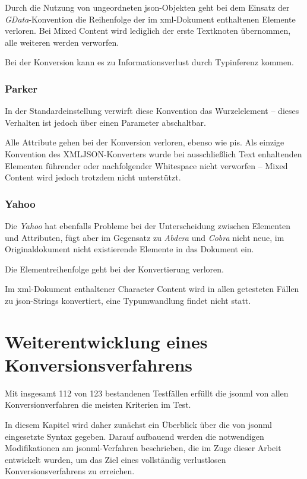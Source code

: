 Durch die Nutzung von ungeordneten \acrshort{json}-Objekten geht bei dem Einsatz der \emph{GData}-Konvention die Reihenfolge der im \acrshort{xml}-Dokument enthaltenen Elemente verloren. Bei Mixed Content wird lediglich der erste Textknoten übernommen, alle weiteren werden verworfen.

Bei der Konversion kann es zu Informationsverlust durch Typinferenz kommen.

\subsection{Parker}
\label{sec:xmljson-parker}

In der Standardeinstellung verwirft diese Konvention das Wurzelelement -- dieses Verhalten ist jedoch über einen Parameter abschaltbar.

Alle Attribute gehen bei der Konversion verloren, ebenso wie \glspl{pi}. Als einzige Konvention des XMLJSON-Konverters wurde bei ausschließlich Text enhaltenden Elementen führender oder nachfolgender Whitespace nicht verworfen -- Mixed Content wird jedoch trotzdem nicht unterstützt.

\subsection{Yahoo}
\label{sec:xmljson-yahoo}

Die \emph{Yahoo} hat ebenfalls Probleme bei der Unterscheidung zwischen Elementen und Attributen, fügt aber im Gegensatz zu \emph{Abdera} und \emph{Cobra} nicht neue, im Originaldokument nicht existierende Elemente in das Dokument ein.

Die Elementreihenfolge geht bei der Konvertierung verloren.

Im \acrshort{xml}-Dokument enthaltener Character Content wird in allen getesteten Fällen zu \acrshort{json}-Strings konvertiert, eine Typumwandlung findet nicht statt.

\chapter{Weiterentwicklung eines Konversionsverfahrens}
\label{chap:jsonml}

Mit insgesamt 112 von 123 bestandenen Testfällen erfüllt die \acrfull{jsonml} von allen Konversionverfahren die meisten Kriterien im Test.

In diesem Kapitel wird daher zunächst ein Überblick über die von \acrshort{jsonml} eingesetzte Syntax gegeben.
Darauf aufbauend werden die notwendigen Modifikationen am \acrshort{jsonml}-Verfahren beschrieben, die im Zuge dieser Arbeit entwickelt wurden, um das Ziel eines vollständig verlustlosen Konversionsverfahrens zu erreichen.

